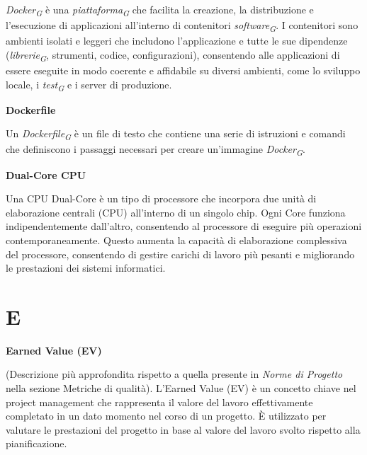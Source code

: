 \documentclass{article}
\begin{document}
\vspace{0.1cm}

\textit{Docker}\textsubscript{\textit{G}} è una \textit{piattaforma}\textsubscript{\textit{G}} che facilita la creazione, la distribuzione e l'esecuzione di applicazioni all'interno di contenitori \textit{software}\textsubscript{\textit{G}}. I contenitori sono ambienti isolati e leggeri che includono l'applicazione e tutte le sue dipendenze (\textit{librerie}\textsubscript{\textit{G}}, strumenti, codice, configurazioni), consentendo alle applicazioni di essere eseguite in modo coerente e affidabile su diversi ambienti, come lo sviluppo locale, i \textit{test}\textsubscript{\textit{G}} e i server di produzione.

\vspace{0.4cm}

\textbf{Dockerfile}

\vspace{0.1cm}

Un \textit{Dockerfile}\textsubscript{\textit{G}} è un file di testo che contiene una serie di istruzioni e comandi che definiscono i passaggi necessari per creare un'immagine \textit{Docker}\textsubscript{\textit{G}}.

\vspace{0.4cm}

\textbf{Dual-Core CPU}

\vspace{0.1cm}

Una CPU Dual-Core è un tipo di processore che incorpora due unità di elaborazione centrali (CPU) all'interno di un singolo chip. Ogni Core funziona indipendentemente dall'altro, consentendo al processore di eseguire più operazioni contemporaneamente. Questo aumenta la capacità di elaborazione complessiva del processore, consentendo di gestire carichi di lavoro più pesanti e migliorando le prestazioni dei sistemi informatici.

\pagebreak
\section*{E}
{}

\vspace{0.4cm}

\textbf{Earned Value (EV)}

\vspace{0.1cm}

(Descrizione più approfondita rispetto a quella presente in \textit{Norme di Progetto} nella sezione Metriche di qualità). L'Earned Value (EV) è un concetto chiave nel project management che rappresenta il valore del lavoro effettivamente completato in un dato momento nel corso di un progetto. È utilizzato per valutare le prestazioni del progetto in base al valore del lavoro svolto rispetto alla pianificazione.
\end{document}
